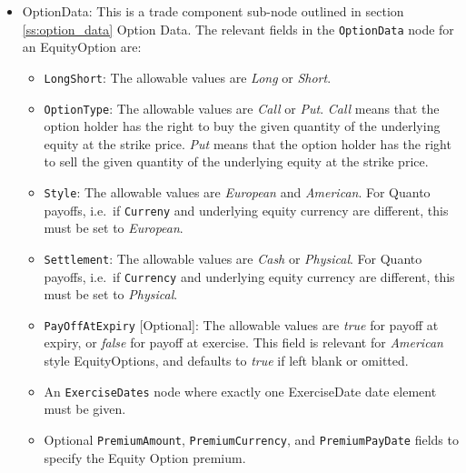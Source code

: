 \begin{itemize}
	\item OptionData: This is a trade component sub-node outlined in section \ref{ss:option_data} Option Data. The relevant fields in the \lstinline!OptionData! node for an EquityOption are:

	
	\begin{itemize}
	\item \lstinline!LongShort!: The allowable values are \emph{Long} or \emph{Short}.

	\item \lstinline!OptionType!: The allowable values are \emph{Call} or \emph{Put}.  \emph{Call} means that the option holder has the right to buy the given quantity of the underlying equity at the strike price.  \emph{Put} means that the option holder has the right to sell the given quantity of the underlying equity at the strike price. 
	
\item  \lstinline!Style!: The allowable values are \emph{European} and \emph{American}. For Quanto payoffs, i.e.\ if \lstinline!Curreny! and underlying equity currency are different, this must be set to \emph{European}.

\item  \lstinline!Settlement!: The allowable values are \emph{Cash} or \emph{Physical}. For Quanto payoffs, i.e.\ if \lstinline!Currency! and underlying equity currency are different, this must be set to \emph{Physical}.

\item \lstinline!PayOffAtExpiry! [Optional]: The allowable values are \emph{true} for payoff at expiry, or \emph{false} for payoff at exercise. This field is relevant for \emph{American} style EquityOptions, and defaults to \emph{true} if left blank or omitted. 

\item An \lstinline!ExerciseDates! node where exactly one ExerciseDate date element must be given. 

\item Optional \lstinline!PremiumAmount!,  \lstinline!PremiumCurrency!, and \lstinline!PremiumPayDate! fields to specify the Equity Option premium. 

\end{itemize}
	


\end{itemize}
